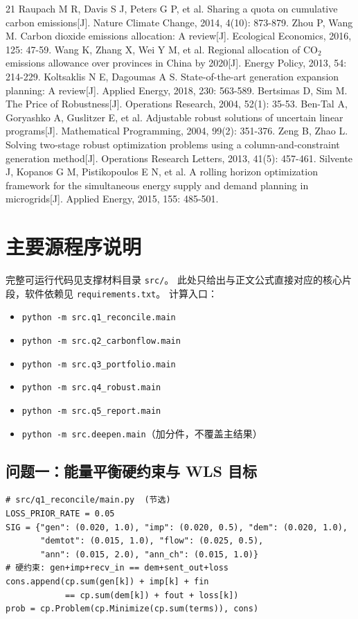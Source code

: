 \documentclass[UTF8,a4paper,zihao=-4,fontset=fandol]{ctexart}
\begin{document}
\begin{thebibliography}{21}
 Raupach M R, Davis S J, Peters G P, et al. Sharing a quota on cumulative carbon emissions[J]. Nature Climate Change, 2014, 4(10): 873-879.
 Zhou P, Wang M. Carbon dioxide emissions allocation: A review[J]. Ecological Economics, 2016, 125: 47-59.
 Wang K, Zhang X, Wei Y M, et al. Regional allocation of CO$_2$ emissions allowance over provinces in China by 2020[J]. Energy Policy, 2013, 54: 214-229.
 Koltsaklis N E, Dagoumas A S. State-of-the-art generation expansion planning: A review[J]. Applied Energy, 2018, 230: 563-589.
 Bertsimas D, Sim M. The Price of Robustness[J]. Operations Research, 2004, 52(1): 35-53.
 Ben-Tal A, Goryashko A, Guslitzer E, et al. Adjustable robust solutions of uncertain linear programs[J]. Mathematical Programming, 2004, 99(2): 351-376.
 Zeng B, Zhao L. Solving two-stage robust optimization problems using a column-and-constraint generation method[J]. Operations Research Letters, 2013, 41(5): 457-461.
 Silvente J, Kopanos G M, Pistikopoulos E N, et al. A rolling horizon optimization framework for the simultaneous energy supply and demand planning in microgrids[J]. Applied Energy, 2015, 155: 485-501.
\end{thebibliography}

\newpage
\appendix
\section{主要源程序说明}
{\sloppy
完整可运行代码见支撑材料目录 \texttt{src/}。
此处只给出与正文公式直接对应的核心片段，软件依赖见 \texttt{requirements.txt}。
}
计算入口：
\begin{itemize}[leftmargin=2.2em]
\item \texttt{python -m src.q1\_reconcile.main}
\item \texttt{python -m src.q2\_carbonflow.main}
\item \texttt{python -m src.q3\_portfolio.main}
\item \texttt{python -m src.q4\_robust.main}
\item \texttt{python -m src.q5\_report.main}
\item \texttt{python -m src.deepen.main}（加分件，不覆盖主结果）
\end{itemize}

\subsection{问题一：能量平衡硬约束与 WLS 目标}
\begin{lstlisting}
# src/q1_reconcile/main.py  (节选)
LOSS_PRIOR_RATE = 0.05
SIG = {"gen": (0.020, 1.0), "imp": (0.020, 0.5), "dem": (0.020, 1.0),
       "demtot": (0.015, 1.0), "flow": (0.025, 0.5),
       "ann": (0.015, 2.0), "ann_ch": (0.015, 1.0)}
# 硬约束: gen+imp+recv_in == dem+sent_out+loss
cons.append(cp.sum(gen[k]) + imp[k] + fin
            == cp.sum(dem[k]) + fout + loss[k])
prob = cp.Problem(cp.Minimize(cp.sum(terms)), cons)
\end{lstlisting}
\end{document}
